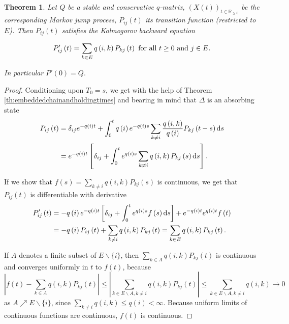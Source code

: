 \documentclass[12pt,a4paper]{scrartcl}
\newtheorem{theorem}{Theorem}[section]
\numberwithin{equation}{section}
\newcommand{\R}{\mathbb{R}} %
\begin{document}
\begin{theorem}
Let $ Q $ be a stable and conservative $q$-matrix, $\left(X\left(t\right)\right)_{t \in \R_{\geq 0}}$ be the corresponding Markov jump process, $P_{ij}\left(t\right)$ its transition function (restricted to $E$). Then $P_{ij}\left(t\right)$ satisfies the Kolmogorov backward equation 

\begin{equation}
P_{ij}'\left(t\right) = \sum_{k \in E} q\left(i,k\right) P_{kj}\left(t\right) \textnormal{ for all } t\geq0 \textnormal{ and } j\in E.
\end{equation}

In particular $ P'\left(0\right) = Q.$
\end{theorem}
\begin{proof} Conditioning upon $T_0 = s$, we get with the help of Theorem \ref{th:embeddedchainandholdingtimes} and bearing in mind that $\Delta$ is an absorbing state
\begin{align*} P_{ij}\left(t\right) &= \delta_{ij}e^{-q\left(i\right)t} + \int_{0}^t q\left(i\right) e^{-q\left(i\right) s} \sum_{k \neq i} \frac{q\left(i,k\right)}{q\left(i\right)} P_{kj}\left(t-s\right) \textnormal{d}s \\
&= e^{-q\left(i\right) t} \left[\delta_{ij} + \int_0^t e^{q\left(i\right) s} \sum_{k \neq i} q\left(i,k\right) P_{kj}\left(s\right) \textnormal{d}s \right].
\end{align*}

If we show that $ f\left(s\right) = \sum_{k \neq i} q\left(i,k\right) P_{kj}\left(s\right) $ is continuous, we get that $P_{ij}\left(t\right)$ is differentiable with derivative
\begin{align*}
P_{ij}'\left(t\right) &= -q\left(i\right)e^{-q\left(i\right)t}\left[\delta_{ij} + \int_0^t e^{q\left(i\right)s}f\left(s\right) \textnormal{d}s \right] + e^{-q\left(i\right)t} e^{q\left(i\right)t} f\left(t\right) \\
&= -q\left(i\right) P_{ij}\left(t\right) + \sum_{k \neq i} q\left(i,k\right) P_{kj}\left(t\right) = \sum_{k \in E} q\left(i,k\right) P_{kj}\left(t\right).
\end{align*}

If $A$ denotes a finite subset of $E\backslash \lbrace i\rbrace $, then $\sum_{k \in A} q\left(i,k\right) P_{kj}\left(t\right)$ is continuous and converges uniformly in $t$ to $f\left(t\right)$, because
$$\left|f\left(t\right) - \sum_{k \in A} q\left(i,k\right) P_{kj}\left(t\right) \right| \leq \left| \sum_{k \in E\backslash A, k \neq i} q\left(i,k\right) P_{kj}\left(t\right) \right| \leq \sum_{k \in E\backslash A, k \neq i} q\left(i,k\right) \to 0 $$
as $ A \nearrow E\backslash \lbrace i\rbrace $, since $\sum_{k \neq i} q\left(i,k\right) \leq q\left(i\right) < \infty $. Because uniform limits of continuous functions are continuous, $f\left(t\right)$ is continuous.


\end{proof}
\end{document}
